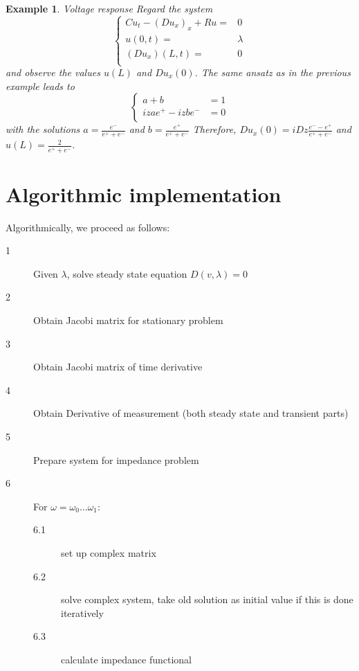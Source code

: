 \documentclass[12pt]{amsproc}
\newtheorem{example}{Example}
\begin{document}
\begin{example}{Voltage response}
Regard the system
  \begin{equation*}
    \begin{cases}
      Cu_t - (Du_x)_x + Ru=&0\\
      u(0,t)=&\lambda\\
      (Du_x)(L,t)=&0\\
    \end{cases}
  \end{equation*}
  and observe the values $u(L)$ and $Du_x(0)$.
The same ansatz as in the previous example leads to 
\begin{equation*}
  \begin{cases}
    a+b&=1\\
    izae^+-izbe^-&=0\\
  \end{cases}
\end{equation*}
with the solutions $a=\frac{e^-}{e^++e^-}$ and $b=\frac{e^+}{e^++e^-}$
Therefore,  $Du_x(0)=iDz\frac{e^--e^+}{e^++e^-}$ and
$u(L)=\frac2{e^++e^-}$.
\end{example}


\section{Algorithmic implementation}

Algorithmically, we proceed as follows:

\begin{description}
\item[1] Given $\lambda$, solve steady state equation $D(v,\lambda)=0$
\item[2] Obtain Jacobi matrix for stationary problem
\item[3] Obtain Jacobi matrix of time derivative
\item[4] Obtain Derivative of measurement (both steady state and transient parts)
\item[5] Prepare system for impedance problem
\item[6] For $\omega=\omega_0\dots\omega_1$:
  \begin{description}
  \item[6.1] set up complex matrix
  \item[6.2] solve complex system, take old solution as initial value if this is done iteratively
  \item[6.3]calculate impedance functional
  \end{description}
\end{description}
\end{document}
